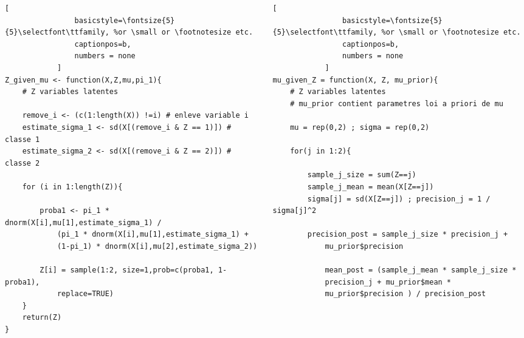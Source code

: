 \begin{frame}[fragile]
    \vspace{-0.2cm}
    \begin{columns}
        \begin{column}{0.5\textwidth}
            
            \begin{lstlisting}[
                basicstyle=\fontsize{5}{5}\selectfont\ttfamily, %or \small or \footnotesize etc.
                captionpos=b,
                numbers = none
            ]
Z_given_mu <- function(X,Z,mu,pi_1){
    # Z variables latentes
    
    remove_i <- (c(1:length(X)) !=i) # enleve variable i
    estimate_sigma_1 <- sd(X[(remove_i & Z == 1)]) # classe 1
    estimate_sigma_2 <- sd(X[(remove_i & Z == 2)]) # classe 2 
                    
    for (i in 1:length(Z)){
                    
        proba1 <- pi_1 * dnorm(X[i],mu[1],estimate_sigma_1) / 
            (pi_1 * dnorm(X[i],mu[1],estimate_sigma_1) + 
            (1-pi_1) * dnorm(X[i],mu[2],estimate_sigma_2))

        Z[i] = sample(1:2, size=1,prob=c(proba1, 1-proba1),
            replace=TRUE)
    }
    return(Z)
}
        \end{lstlisting}
            
        \end{column}
        \begin{column}{0.5\textwidth}  %
            
            \begin{lstlisting}[
                basicstyle=\fontsize{5}{5}\selectfont\ttfamily, %or \small or \footnotesize etc.
                captionpos=b,
                numbers = none
            ]
mu_given_Z = function(X, Z, mu_prior){
    # Z variables latentes  
    # mu_prior contient parametres loi a priori de mu

    mu = rep(0,2) ; sigma = rep(0,2)
        
    for(j in 1:2){
        
        sample_j_size = sum(Z==j) 
        sample_j_mean = mean(X[Z==j])
        sigma[j] = sd(X[Z==j]) ; precision_j = 1 / sigma[j]^2
        
        precision_post = sample_j_size * precision_j + 
            mu_prior$precision
        
            mean_post = (sample_j_mean * sample_j_size * 
            precision_j + mu_prior$mean * 
            mu_prior$precision ) / precision_post
        

\end{lstlisting}
\end{column}
\end{columns}
\end{frame}
